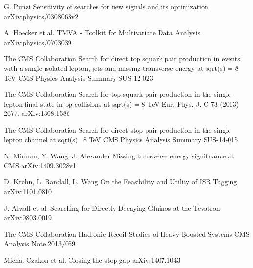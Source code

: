 \begin{thebibliography}{2}
             {G. Punzi}
             {Sensitivity of searches for new signals and its optimization}
             {arXiv:physics/0308063v2}

             {A. Hoecker et al.}
             {TMVA - Toolkit for Multivariate Data Analysis}
             {arXiv:physics/0703039}


             {The CMS Collaboration}
             {Search for direct top squark pair production in events with a single isolated lepton, jets and missing transverse energy at sqrt(s) = 8 TeV}
             {CMS Physics Analysis Summary SUS-12-023}

             {The CMS Collaboration}
             {Search for top-squark pair production in the single-lepton final state in pp collisions at sqrt(s) = 8 TeV}
             {Eur. Phys. J. C 73 (2013) 2677. arXiv:1308.1586}

             {The CMS Collaboration}
             {Search for direct stop pair production in the single lepton channel at sqrt(s)=8 TeV}
             {CMS Physics Analysis Summary SUS-14-015}


             {N. Mirman, Y. Wang, J. Alexander}
             {Missing transverse energy significance at CMS}
             {arXiv:1409.3028v1}


             {D. Krohn, L. Randall, L. Wang}
             {On the Feasibility and Utility of ISR Tagging}
             {arXiv:1101.0810}

             {J. Alwall et al.}
             {Searching for Directly Decaying Gluinos at the Tevatron}
             {arXiv:0803.0019}

             {The CMS Collaboration}
             {Hadronic Recoil Studies of Heavy Boosted Systems}
             {CMS Analysis Note 2013/059}


             {Michal Czakon et al.}
             {Closing the stop gap}
             {arXiv:1407.1043}

\end{thebibliography}



